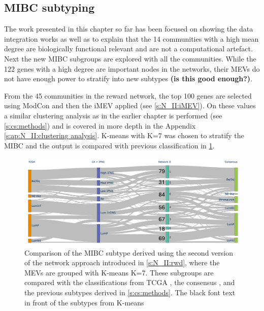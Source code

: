 \subsection{MIBC subtyping}

The work presented in this chapter so far has been focused on showing the data integration works as well as to explain that the 14 communities with a high mean degree are biologically functional relevant and are not a computational artefact. Next the new MIBC subgroups are explored with all the communities. While the 122 genes with a high degree are important nodes in the networks, their MEVs do not have enough power to stratify into new subtypes \textbf{(is this good enough?)}.

From the 45 communities in the reward network, the top 100 genes are selected using ModCon and then the iMEV applied (see \cref{s:N_II:iMEV}). On these values a similar clustering analysis as in the earlier chapter is performed (see \cref{s:cs:methods}) and is covered in more depth in the Appendix 
\cref{s:ap:N_II:clustering analysis}. K-means with K=7 was chosen to stratify the MIBC and the output is compared with previous classification in \cref{fig:N_II:mibc_comp}.


\begin{figure}[!t]    
    \centering
    \includegraphics[width=1.0\textwidth,height=1.0\textheight,keepaspectratio]{Sections/Network_II/resources/reward/cluster_comp_final.png}
    \caption{Comparison of the MIBC subtype derived using the second version of the network approach introduced in \cref{s:N_II:rwd}, where the MEVs are grouped with K-means K=7. These subgroups are compared with the classifications from TCGA \citep{Robertson2017-mg}, the consensus \citep{Kamoun2020-tj}, and the previous subtypes derived in \cref{s:cs:methods}. The black font text in front of the subtypes from K-means }
    \label{fig:N_II:mibc_comp}
\end{figure}

